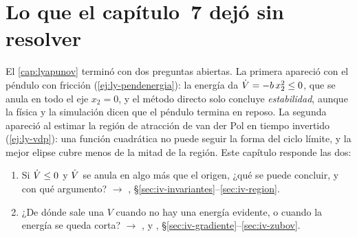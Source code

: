 \section{Lo que el capítulo~7 dejó sin resolver}
\label{sec:iv-porque}

El \cref{cap:lyapunov} terminó con dos preguntas abiertas. La primera apareció con el péndulo con fricción (\cref{ej:ly-pendenergia}): la energía da $\dot V=-b\,x_2^2\le0$, que se anula en todo el eje $x_2=0$, y el método directo solo concluye \emph{estabilidad}, aunque la física y la simulación dicen que el péndulo termina en reposo. La segunda apareció al estimar la región de atracción de van der Pol en tiempo invertido (\cref{ej:ly-vdp}): una función cuadrática no puede seguir la forma del ciclo límite, y la mejor elipse cubre menos de la mitad de la región. Este capítulo responde las dos:
\begin{enumerate}
  \item Si $\dot V\le0$ y $\dot V$ se anula en algo más que el origen, ¿qué se puede concluir, y con qué argumento? $\to$ , \S\ref{sec:iv-invariantes}--\ref{sec:iv-region}.
  \item ¿De dónde sale una $V$ cuando no hay una energía evidente, o cuando la energía se queda corta? $\to$ ,  y , \S\ref{sec:iv-gradiente}--\ref{sec:iv-zubov}.
\end{enumerate}

